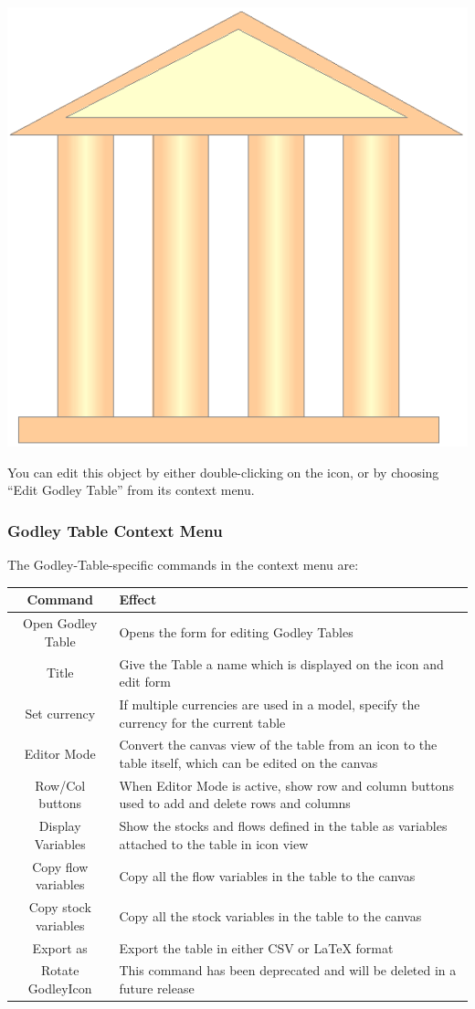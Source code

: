 \noindent\includegraphics[width=\textwidth]{images/GodleyTableIconMode}

You can edit this object by either double-clicking on the icon, or
by choosing ``Edit Godley Table'' from its context menu.

\subsubsection{Godley Table Context Menu}

The Godley-Table-specific commands in the context menu are:

\begin{tabular}{|c|p{}|}
\hline 
Command & Effect\tabularnewline
\hline 
\hline 
Open Godley Table & Opens the form for editing Godley Tables\tabularnewline
\hline 
Title & Give the Table a name which is displayed on the icon and edit form\tabularnewline
\hline 
Set currency & If multiple currencies are used in a model, specify the currency for
the current table\tabularnewline
\hline 
Editor Mode & Convert the canvas view of the table from an icon to the table itself,
which can be edited on the canvas\tabularnewline
\hline 
Row/Col buttons & When Editor Mode is active, show row and column buttons used to add
and delete rows and columns\tabularnewline
\hline 
Display Variables & Show the stocks and flows defined in the table as variables attached
to the table in icon view\tabularnewline
\hline 
Copy flow variables & Copy all the flow variables in the table to the canvas\tabularnewline
\hline 
Copy stock variables & Copy all the stock variables in the table to the canvas\tabularnewline
\hline 
Export as & Export the table in either CSV or LaTeX format\tabularnewline
\hline 
Rotate GodleyIcon & This command has been deprecated and will be deleted in a future release\tabularnewline
\hline 
\end{tabular}

